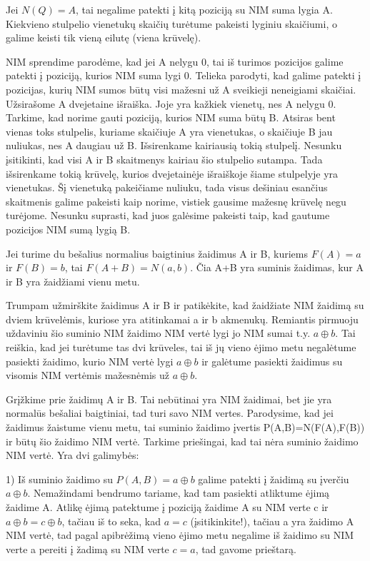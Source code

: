 Jei $N(Q)=A$, tai negalime patekti į kitą
poziciją su NIM suma lygia A. Kiekvieno stulpelio vienetukų skaičių
turėtume pakeisti lyginiu skaičiumi, o galime keisti tik vieną eilutę (viena
krūvelę).

NIM sprendime parodėme, kad jei A nelygu 0, tai iš turimos pozicijos galime
patekti į poziciją, kurios NIM suma lygi 0. Telieka parodyti, kad galime
patekti į pozicijas, kurių NIM sumos būtų visi mažesni už A sveikieji
neneigiami skaičiai. Užsirašome A dvejetaine išraiška. Joje yra kažkiek
vienetų, nes A nelygu 0. Tarkime, kad norime gauti poziciją, kurios NIM suma
būtų B. Atsiras bent vienas toks stulpelis, kuriame skaičiuje A yra vienetukas,
o skaičiuje B jau nuliukas, nes A daugiau už B. Išsirenkame
kairiausią tokią stulpelį. Nesunku įsitikinti, kad visi A ir B skaitmenys
kairiau šio stulpelio sutampa. Tada išsirenkame tokią krūvelę,
kurios dvejetainėje išraiškoje šiame stulpelyje yra vienetukas. Šį vienetuką
pakeičiame nuliuku, tada visus dešiniau esančius skaitmenis galime pakeisti
kaip norime, vistiek gausime mažesnę krūvelę negu turėjome. Nesunku suprasti,
kad juos galėsime pakeisti taip, kad gautume pozicijos NIM sumą lygią B.

\begin{thm}
  Jei turime du bešalius normalius baigtinius žaidimus A ir B, kuriems $F(A)=a$ ir $F(B)=b$, tai $F(A+B)=N(a,b)$. Čia A+B yra suminis žaidimas, kur A ir B yra žaidžiami vienu metu. 
\end{thm}

Trumpam užmirškite žaidimus A ir B ir patikėkite, kad žaidžiate NIM žaidimą su
dviem krūvelėmis, kuriose yra atitinkamai a ir b akmenukų. Remiantis pirmuoju
uždaviniu šio suminio NIM žaidimo NIM vertė lygi jo NIM sumai t.y.
$a\oplus b$. Tai reiškia, kad jei turėtume tas dvi krūveles, tai iš jų vieno ėjimo metu
negalėtume pasiekti žaidimo, kurio NIM vertė lygi  $a\oplus b$ ir galėtume
pasiekti žaidimus su visomis NIM vertėmis mažesnėmis už $a\oplus b$. 

Grįžkime prie žaidimų A ir B. Tai nebūtinai yra NIM žaidimai, bet jie yra
normalūs bešaliai baigtiniai, tad turi savo NIM vertes. Parodysime, kad jei žaidimus
žaistume vienu metu, tai suminio žaidimo įvertis P(A,B)=N(F(A),F(B)) ir būtų šio
žaidimo NIM vertė. Tarkime priešingai, kad tai nėra suminio žaidimo NIM vertė.
Yra dvi galimybės:

1) Iš suminio žaidimo su  $P(A,B)=a\oplus b$ galime patekti į žaidimą su
įverčiu $a\oplus b$. Nemažindami bendrumo tariame, kad tam pasiekti atliktume
ėjimą žaidime A. Atlikę ėjimą patektume į poziciją žaidime A su NIM verte c ir
$a\oplus b = c\oplus b$, tačiau iš to seka, kad $a=c$ (įsitikinkite!), tačiau
a yra žaidimo A NIM vertė, tad pagal apibrėžimą vieno ėjimo metu negalime iš
žaidimo su NIM verte a pereiti į žadimą su NIM verte $c=a$, tad gavome
prieštarą.

